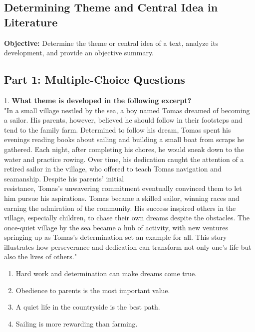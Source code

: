 \documentclass[12pt]{article}
\begin{document}
\subsection*{Determining Theme and Central Idea in Literature}
\onehalfspacing

\begin{tcolorbox}[colframe=black!40, colback=gray!0, title=Learning Objective]
\textbf{Objective:} Determine the theme or central idea of a text, analyze its development, and provide an objective summary.
\end{tcolorbox}

\subsection*{Part 1: Multiple-Choice Questions}

1. \textbf{What theme is developed in the following excerpt?\\}
"In a small village nestled by the sea, a boy named Tomas dreamed of becoming a sailor. His parents, however, believed he should follow in their footsteps and tend to the family farm. Determined to follow his dream, Tomas spent his evenings reading books about sailing and building a small boat from scraps he gathered. Each night, after completing his chores, he would sneak down to the water and practice rowing. Over time, his dedication caught the attention of a retired sailor in the village, who offered to teach Tomas navigation and seamanship. Despite his parents' initial \\resistance, Tomas’s unwavering commitment eventually convinced them to let him pursue his aspirations. Tomas became a skilled sailor, winning races and earning the admiration of the community. His success inspired others in the village, especially children, to chase their own dreams despite the obstacles. The once-quiet village by the sea became a hub of activity, with new ventures springing up as Tomas’s determination set an example for all. This story illustrates how perseverance and dedication can transform not only one’s life but also the lives of others."  
\begin{enumerate}[label=\Alph*.]
    \item Hard work and determination can make dreams come true.  
    \item Obedience to parents is the most important value.  
    \item A quiet life in the countryside is the best path.  
    \item Sailing is more rewarding than farming.  
\end{enumerate}
\end{document}
